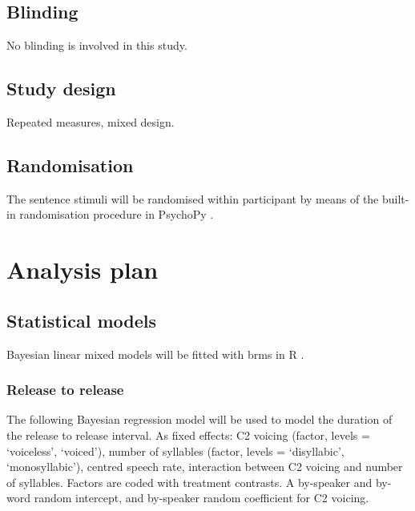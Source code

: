 \documentclass[11pt,]{article}
\begin{document}
\hypertarget{blinding}{%
\subsection{Blinding}\label{blinding}}

No blinding is involved in this study.

\hypertarget{study-design}{%
\subsection{Study design}\label{study-design}}

Repeated measures, mixed design.

\hypertarget{randomisation}{%
\subsection{Randomisation}\label{randomisation}}

The sentence stimuli will be randomised within participant by means of
the built-in randomisation procedure in PsychoPy \citep{peirce2009}.

\hypertarget{analysis-plan}{%
\section{Analysis plan}\label{analysis-plan}}

\hypertarget{statistical-models}{%
\subsection{Statistical models}\label{statistical-models}}

\label{s:stats}

Bayesian linear mixed models
\citep{vasishth2018, mcelreath2015, kruschke2015} will be fitted with
brms \citep{burkner2017, burkner2018} in R \citep{r-core-team2018}.

\hypertarget{release-to-release}{%
\subsubsection{Release to release}\label{release-to-release}}

The following Bayesian regression model will be used to model the
duration of the release to release interval. As fixed effects: C2
voicing (factor, levels = `voiceless', `voiced'), number of syllables
(factor, levels = `disyllabic', `monosyllabic'), centred speech rate,
interaction between C2 voicing and number of syllables. Factors are
coded with treatment contrasts. A by-speaker and by-word random
intercept, and by-speaker random coefficient for C2 voicing.
\end{document}

